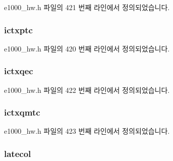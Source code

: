 e1000\+\_\+hw.\+h 파일의 421 번째 라인에서 정의되었습니다.

\subsubsection[{\texorpdfstring{ictxptc}{ictxptc}}]{ ictxptc}\hypertarget{structe1000__hw__stats_a2969258198c67f9d9022448b98d1ea87}{}\label{structe1000__hw__stats_a2969258198c67f9d9022448b98d1ea87}


e1000\+\_\+hw.\+h 파일의 420 번째 라인에서 정의되었습니다.

\subsubsection[{\texorpdfstring{ictxqec}{ictxqec}}]{ ictxqec}\hypertarget{structe1000__hw__stats_a18e1e3eaf7e99493c9fa8f2437dd24b4}{}\label{structe1000__hw__stats_a18e1e3eaf7e99493c9fa8f2437dd24b4}


e1000\+\_\+hw.\+h 파일의 422 번째 라인에서 정의되었습니다.

\subsubsection[{\texorpdfstring{ictxqmtc}{ictxqmtc}}]{ ictxqmtc}\hypertarget{structe1000__hw__stats_aa1df51dbaac03caa52f8033f1df82658}{}\label{structe1000__hw__stats_aa1df51dbaac03caa52f8033f1df82658}


e1000\+\_\+hw.\+h 파일의 423 번째 라인에서 정의되었습니다.

\subsubsection[{\texorpdfstring{latecol}{latecol}}]{ latecol}\hypertarget{structe1000__hw__stats_a9ac1db756a3675733787ddc316842d38}{}\label{structe1000__hw__stats_a9ac1db756a3675733787ddc316842d38}


